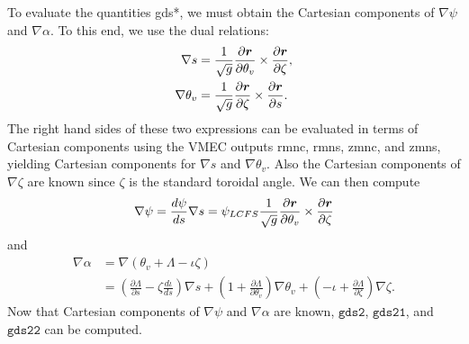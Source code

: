 \documentclass[11pt,letter]{article}
\newcommand{\vect}[1]{\mbox{\boldmath $#1$}}
\newcommand{\gdstwo}{\mathtt{gds2}}
\newcommand{\gdstwoone}{\mathtt{gds21}}
\newcommand{\gdstwotwo}{\mathtt{gds22}}
\begin{document}
To evaluate the quantities {\ttfamily gds*}, we must obtain the Cartesian components of
$\nabla\psi$ and $\nabla \alpha$. To this end, we use the dual relations:
\begin{align}
\nabla s &=  \frac{1}{\sqrt{g}} \frac{\partial\vect{r}}{\partial\theta_v} \times \frac{\partial\vect{r}}{\partial\zeta}, \label{eq:nabla_s}\\
\nabla\theta_v &= \frac{1}{\sqrt{g}} \frac{\partial\vect{r}}{\partial\zeta} \times \frac{\partial\vect{r}}{\partial s}
\label{eq:nabla_theta}.
\end{align}
The right hand sides of these two expressions can be evaluated in terms of Cartesian components using the VMEC
outputs {\ttfamily rmnc}, {\ttfamily rmns}, {\ttfamily zmnc}, and {\ttfamily zmns}, yielding
Cartesian components for $\nabla s$ and $\nabla\theta_v$. Also the Cartesian components of $\nabla\zeta$
are known since $\zeta$ is the standard toroidal angle.
We can then compute
\begin{equation}
\nabla\psi = \frac{d\psi}{ds} \nabla s = \psi_{LCFS}  \frac{1}{\sqrt{g}} \frac{\partial\vect{r}}{\partial\theta_v} \times \frac{\partial\vect{r}}{\partial\zeta}
\end{equation}
and
\begin{align}
\nabla\alpha 
&= \nabla(\theta_v + \Lambda - \iota \zeta) \nonumber \\
&= \left(\frac{\partial\Lambda}{\partial s} - \zeta \frac{d\iota}{ds}\right)\nabla s
+ \left( 1 + \frac{\partial\Lambda}{\partial\theta_v}\right) \nabla\theta_v
+ \left( -\iota + \frac{\partial\Lambda}{\partial\zeta}\right) \nabla\zeta.
\label{eq:grad_alpha}
\end{align}
Now that Cartesian components of $\nabla\psi$ and $\nabla \alpha$ are known, $\gdstwo$, $\gdstwoone$, and $\gdstwotwo$ can be computed. 
\end{document}
